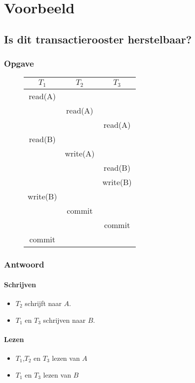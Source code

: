 \documentclass[transacties.tex]{subfiles}
\begin{document}
\chapter{Voorbeeld}
\renewcommand\thesection{V\arabic{section}}
\renewcommand\thesubsection{V\arabic{section}}
\section{Is dit transactierooster herstelbaar?}
\subsection*{Opgave}
\begin{figure}[H]
\centering
\begin{tabular}{c|c|c}
$T_1$ & $T_2$ & $T_3$\\
\hline
read(A) &&\\
&read(A)&\\
&&read(A)\\
read(B)&&\\
&write(A)&\\
&&read(B)\\
&&write(B)\\
write(B)&&\\
&commit&\\
&&commit\\
commit&&\\
\end{tabular}
\end{figure}


\subsection*{Antwoord}
\subsubsection*{Schrijven}
\begin{itemize}
\item $T_2$ schrijft naar $A$.
\item $T_1$ en $T_3$ schrijven naar $B$.
\end{itemize}
\subsubsection*{Lezen}
\begin{itemize}
\item $T_1$,$T_2$ en $T_3$ lezen van $A$ 
\item $T_1$ en $T_3$ lezen van $B$
\end{itemize}
\end{document}
